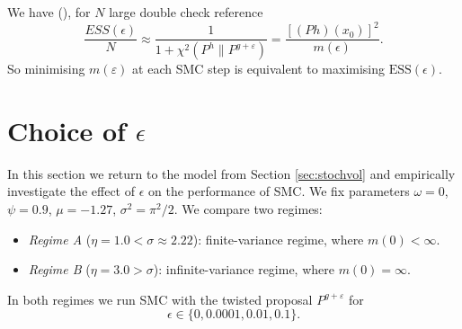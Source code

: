 \documentclass[11pt,reqno]{amsart}
\newcommand{\eps}{\varepsilon}
\theoremstyle{definition}
\newcommand{\note}[1]{{\color{Sienna} #1}}
\begin{document}
We have (\cite{agapiou2017importance}), for $N$ large   \note{double check reference}
\[ \frac{ESS(\epsilon)}{N} \approx \frac{1}{1+\chi^2(P^h \| P^{g+\eps})}= \frac{[(Ph)(x_0)]^2}{m(\epsilon)}. \]
So minimising $m(\eps)$ at each SMC step is equivalent to maximising $\mathrm{ESS}(\epsilon)$. 












%



\section{Choice of $\epsilon$}

In this section we  return to the model from Section \ref{sec:stochvol} and empirically investigate the effect of $\epsilon$ on the performance of SMC. We fix parameters $\omega=0$, $\psi=0.9$, $\mu=-1.27$, $\sigma^2=\pi^2/2$.
We compare two regimes:
\begin{itemize}
  \item \textit{Regime A} ($\eta=1.0 < \sigma\approx 2.22$): finite-variance
    regime, where $m(0)<\infty$.
  \item \textit{Regime B} ($\eta=3.0 > \sigma$): infinite-variance regime,
    where $m(0)=\infty$.
\end{itemize}
In both regimes we run SMC with the twisted proposal $P^{g+\varepsilon}$ for
 \[ \epsilon \in \{0, 0.0001, 0.01, 0.1\}.\]
\end{document}
